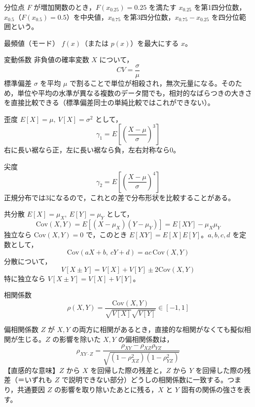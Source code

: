 \documentclass[a4paper,11pt]{ltjsarticle}
\newcommand{\Cov}{\mathrm{Cov}}
\begin{document}
\begin{term}{分位点}
$F$ が増加関数のとき，$F(x_{0.25})=0.25$ を満たす $x_{0.25}$ を第1四分位数，$x_{0.5}$（$F(x_{0.5})=0.5$）を中央値，$x_{0.75}$ を第3四分位数，$x_{0.75}-x_{0.25}$ を四分位範囲という。
\end{term}

\begin{term}{最頻値（モード）}
$f(x)$（または $p(x)$）を最大にする $x$。
\end{term}

\begin{term}{変動係数}
非負値の確率変数 $X$ について，
\[
CV = \frac{\sigma}{\mu}
\]
標準偏差 $\sigma$ を平均 $\mu$ で割ることで単位が相殺され，無次元量になる。そのため，単位や平均の水準が異なる複数のデータ間でも，相対的なばらつきの大きさを直接比較できる（標準偏差同士の単純比較ではこれができない）。
\end{term}

\begin{term}{歪度}
$E[X]=\mu,\ V[X]=\sigma^2$ として，
\[
\gamma_1 = E\!\left[\left(\frac{X-\mu}{\sigma}\right)^{3}\right]
\]
右に長い裾なら正，左に長い裾なら負，左右対称なら0。
\end{term}

\begin{term}{尖度}
\[
\gamma_2 = E\!\left[\left(\frac{X-\mu}{\sigma}\right)^{4}\right]
\]
正規分布では3になるので，これとの差で分布形状を比較することがある。
\end{term}

\begin{term}{共分散}
$E[X]=\mu_X,\ E[Y]=\mu_Y$ として，
\[
\Cov(X,Y) = E[(X-\mu_X)(Y-\mu_Y)] = E[XY]-\mu_X\mu_Y
\]
独立なら $\Cov(X,Y)=0$ で，このとき $E[XY]=E[X]E[Y]$。$a,b,c,d$ を定数として，
\[
\Cov(aX+b,\ cY+d) = ac\,\Cov(X,Y)
\]
分散について，
\[
V[X\pm Y] = V[X]+V[Y]\pm 2\Cov(X,Y)
\]
特に独立なら $V[X\pm Y]=V[X]+V[Y]$。
\end{term}

\begin{term}{相関係数}
\[
\rho(X,Y) = \frac{\Cov(X,Y)}{\sqrt{V[X]}\sqrt{V[Y]}} \in [-1,1]
\]
\end{term}

\begin{term}{偏相関係数}
$Z$ が $X,Y$ の両方に相関があるとき，直接的な相関がなくても擬似相関が生じる。$Z$ の影響を除いた $X,Y$ の偏相関係数は，
\[
\rho_{XY\cdot Z} = \frac{\rho_{XY} - \rho_{XZ}\rho_{YZ}}{\sqrt{(1-\rho_{XZ}^2)(1-\rho_{YZ}^2)}}
\]
【直感的な意味】$Z$ から $X$ を回帰した際の残差と，$Z$ から $Y$ を回帰した際の残差（＝いずれも $Z$ で説明できない部分）どうしの相関係数に一致する。つまり，共通要因 $Z$ の影響を取り除いたあとに残る，$X$ と $Y$ 固有の関係の強さを表す。
\end{term}
\end{document}
